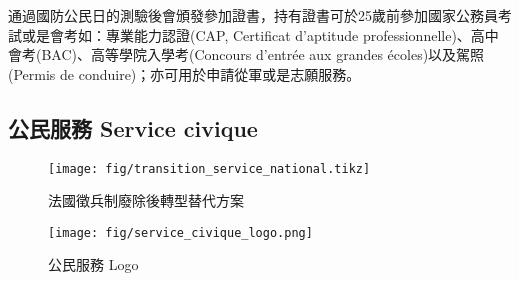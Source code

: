 \documentclass[a4paper,14pt]{extarticle}
\theoremstyle{plain}
\theoremstyle{remark}
\numberwithin{equation}{section}
\begin{document}

\par 
通過國防公民日的測驗後會頒發參加證書，持有證書可於25歲前參加國家公務員考試或是會考如：專業能力認證(CAP, Certificat d'aptitude professionnelle)、高中會考(BAC)、高等學院入學考(Concours d'entrée aux grandes écoles)以及駕照(Permis de conduire)；亦可用於申請從軍或是志願服務。

%



\subsection{公民服務 Service civique}\label{subsection:service_civique}


\begin{figure}[H]
	\centering
  \texttt{[image: fig/transition\_service\_national.tikz]}
\caption{法國徵兵制廢除後轉型替代方案}
\label{fig:transition_service_national}
\end{figure}


\begin{wrapfigure}[]{r}{0.53\textwidth}
  \centering
    \texttt{[image: fig/service\_civique\_logo.png]}
  \caption{公民服務 Logo}
\end{wrapfigure}
\end{document}
